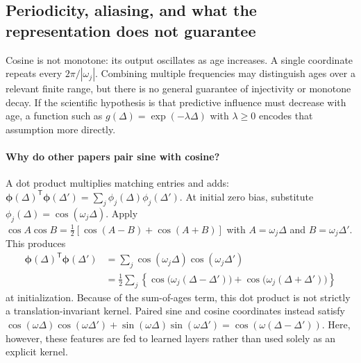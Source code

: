 \documentclass[11pt]{article}
\begin{document}
\subsection{Periodicity, aliasing, and what the representation does not guarantee}
Cosine is not monotone: its output oscillates as age increases. A single coordinate repeats every $2\pi/|\omega_j|$. Combining multiple frequencies may distinguish ages over a relevant finite range, but there is no general guarantee of injectivity or monotone decay. If the scientific hypothesis is that predictive influence must decrease with age, a function such as $g(\Delta)=\exp(-\lambda\Delta)$ with $\lambda\geq0$ encodes that assumption more directly.

\paragraph{Why do other papers pair sine with cosine?}
A dot product multiplies matching entries and adds: $\boldsymbol{\phi}(\Delta)^{\mathsf T}\boldsymbol{\phi}(\Delta')=\sum_j\phi_j(\Delta)\phi_j(\Delta')$. At initial zero bias, substitute $\phi_j(\Delta)=\cos(\omega_j\Delta)$. Apply $\cos A\cos B=\tfrac12[\cos(A-B)+\cos(A+B)]$ with $A=\omega_j\Delta$ and $B=\omega_j\Delta'$. This produces
\begin{align}
\boldsymbol{\phi}(\Delta)^{\mathsf T}\boldsymbol{\phi}(\Delta')
&=\sum_j\cos(\omega_j\Delta)\cos(\omega_j\Delta')\\
&=\tfrac12\sum_j\left\{\cos\bigl(\omega_j(\Delta-\Delta')\bigr)
+\cos\bigl(\omega_j(\Delta+\Delta')\bigr)\right\}
\label{eq:kernel}
\end{align}
at initialization. Because of the sum-of-ages term, this dot product is not strictly a translation-invariant kernel. Paired sine and cosine coordinates instead satisfy $\cos(\omega\Delta)\cos(\omega\Delta')+\sin(\omega\Delta)\sin(\omega\Delta')=\cos(\omega(\Delta-\Delta'))$. Here, however, these features are fed to learned layers rather than used solely as an explicit kernel.
\end{document}

